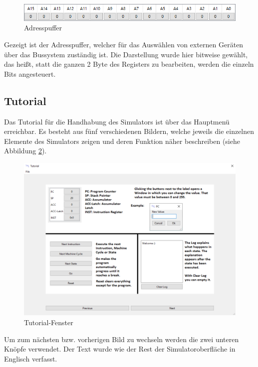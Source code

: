 \documentclass[12pt]{article}
\newcommand{\imgSpaceBefore}{\vspace{10pt}}
\begin{document}
\begin{figure}[h]
\centering
\includegraphics[width=15cm]{bilder/AddBuff}
\caption{Adresspuffer}
\label{fig:AddBuff}
\end{figure}

\noindent
Gezeigt ist der Adresspuffer, welcher für das Auswählen von externen Geräten über das Bussystem zuständig ist. Die Darstellung wurde hier bitweise gewählt, das heißt, statt die ganzen 2 Byte des Registers zu bearbeiten, werden die einzeln Bits angesteuert.


\subsection{Tutorial}
Das Tutorial für die Handhabung des Simulators ist über das Hauptmenü erreichbar. Es besteht aus fünf verschiedenen Bildern, welche jeweils die einzelnen Elemente des Simulators zeigen und deren Funktion näher beschreiben (siehe Abbildung \ref{fig:Tutorial}).\imgSpaceBefore

\begin{figure}[h]
\centering
\includegraphics[width=15cm]{bilder/Tutorial}
\caption{Tutorial-Fenster}
\label{fig:Tutorial}
\end{figure}

\noindent
Um zum nächsten bzw. vorherigen Bild zu wechseln werden die zwei unteren Knöpfe verwendet. Der Text wurde wie der Rest der Simulatoroberfläche in Englisch verfasst.
\end{document}
